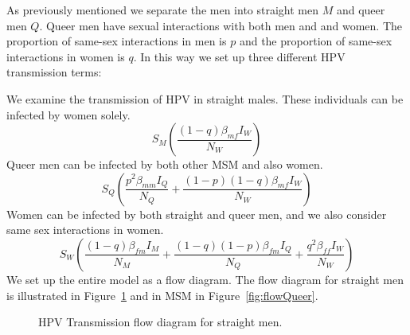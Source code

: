 \documentclass[12pt]{article}
\begin{document}
As previously mentioned we separate the men into straight men $M$ and queer men $Q$.  Queer men have sexual interactions with both men and and women.  The proportion of same-sex interactions in men is $p$ and the proportion of same-sex interactions in women is $q$.  In this way we set up three different HPV transmission terms:

We examine the transmission of HPV in straight males.  These individuals can be infected by women solely.  
\begin{equation}
S_M\left(\frac{(1-q)\beta_{mf}I_W}{N_W}\right)
\end{equation}
Queer men can be infected by both other MSM and also women.
\begin{equation}
S_Q\left(\frac{p^2\beta_{mm}I_Q}{N_Q}+\frac{(1-p)(1-q)\beta_{mf}I_W}{N_W}\right)
\end{equation}
Women can be infected by both straight and queer men, and we also consider same sex interactions in women. 
\begin{equation}
S_W\left(\frac{(1-q)\beta_{fm}I_M}{N_M}+\frac{(1-q)(1-p)\beta_{fm}I_Q}{N_Q}+\frac{q^2\beta_{ff}I_W}{N_W}\right)
\end{equation}
We set up the entire model as a flow diagram.  The flow diagram for straight men is illustrated in Figure~\ref{fig:flowMen} and in MSM in Figure~\ref{fig:flowQueer}.  
\begin{figure}[h!]
\begin{center}
\end{center}
\caption{HPV Transmission flow diagram for straight men.}
\label{fig:flowMen}
\end{figure}
\end{document}
